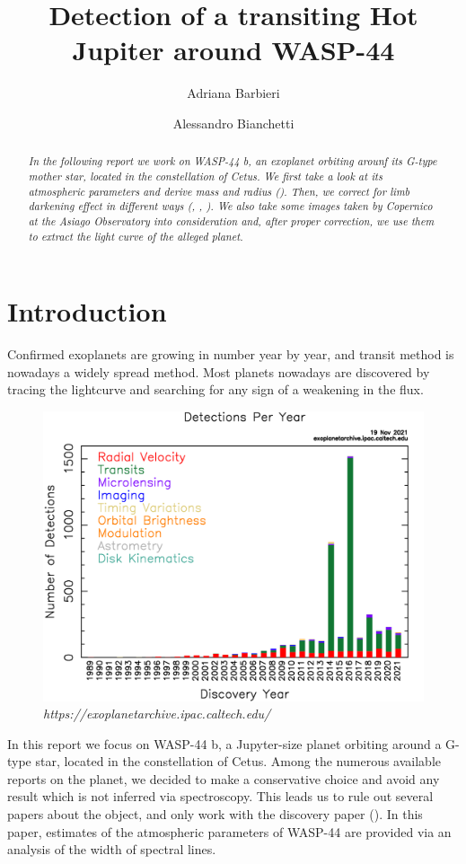 \documentclass[a4paper,11pt,twocolumn]{article}
\title{Detection of a transiting Hot Jupiter around WASP-44}
\author{Adriana Barbieri \and Alessandro Bianchetti}
\begin{document}
\maketitle

\begin{abstract}

\emph{In the following report we work on WASP-44 b, an exoplanet orbiting 
arounf its G-type mother star, located in the constellation of Cetus. 
We first take a look at its atmospheric parameters and derive mass and 
radius (\cite{Morton}). Then, we correct for limb darkening effect in different ways 
(\cite{claret2011}, \cite{claret2017}, \cite{claret2018}). We also take 
some images taken by Copernico at the Asiago Observatory into consideration 
and, after proper correction, we use them to extract the light curve of 
the alleged planet.}

\end{abstract}

\section{Introduction}

Confirmed exoplanets are growing in number year by year, and transit method 
is nowadays a widely spread method. Most planets nowadays are discovered 
by tracing the lightcurve and searching for any sign of a weakening in the 
flux.
\begin{figure}[H]
    \centering  
    \includegraphics[scale=0.15, angle=0]{../pictures/exo_dischist.png}
    \caption*{\textit{ https://exoplanetarchive.ipac.caltech.edu/}}
\end{figure}
In this report we focus on WASP-44 b, a Jupyter-size planet orbiting around 
a G-type star, located in the constellation of Cetus.
Among the numerous available reports on the planet, we decided to make a 
conservative choice and avoid any result which is not inferred via 
spectroscopy. This leads us to rule out several papers about the object, and 
only work with the discovery paper (\cite{Anderson}). In this paper, estimates 
of the atmospheric parameters of WASP-44 are provided via an analysis of 
the width of spectral lines.
\end{document}
